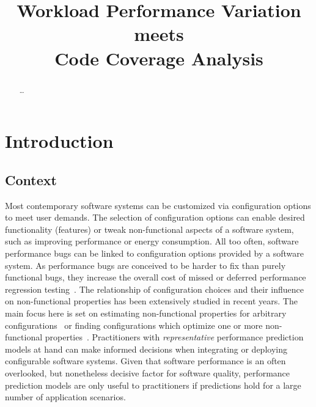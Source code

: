 \documentclass[conference]{IEEEtran}
\begin{document}
\title{Workload Performance Variation meets\\ Code Coverage Analysis}

\author{

}
\maketitle

\begin{abstract}
\ldots
\end{abstract}


\section{Introduction}
\subsection{Context}
Most contemporary software systems can be customized via configuration options to meet user demands. The selection of configuration options can enable desired functionality (features) or tweak non-functional aspects of a software system, such as improving performance or energy consumption. All too often, software performance bugs can be linked to configuration options provided by a software system\cite{han_empirical_2016}. As performance bugs are conceived to be harder to fix than purely functional bugs, they increase the overall cost of missed or deferred performance regression testing~\cite{molyneauxArtApplicationPerformance2015}. The relationship of configuration choices and their influence on non-functional properties has been extensively studied in recent years. The main focus here is set on estimating non-functional properties for arbitrary configurations~\cite{siegmund_performance-influence_2015,haDeepPerf2019,guoVariabilityawarePerformancePrediction2013,guo_2018_data,sarkarCostEfficientSamplingPerformance} or finding configurations which optimize one or more non-functional properties~\cite{nairUsingBadLearners2017,nairFlash18,ohFindingNearoptimalConfigurations2017}. Practitioners with \emph{representative} performance prediction models at hand can make informed decisions when integrating or deploying configurable software systems. Given that software performance is an often overlooked, but nonetheless decisive factor for software quality, performance prediction models are only useful to practitioners if predictions hold for a large number of application scenarios.
\end{document}

